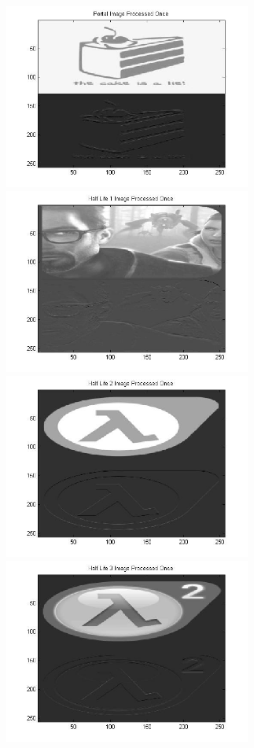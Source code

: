 \documentclass[11 pt]{article}
\begin{document}
\begin{center}
\includegraphics[width=3.2in]{Figure_5.jpg} \includegraphics[width=3.2in]{Figure_6.jpg}\\
\includegraphics[width=3.2in]{Figure_7.jpg} \includegraphics[width=3.2in]{Figure_8.jpg}
\end{center}
\end{document}
